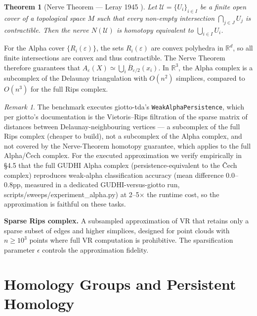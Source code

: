 \documentclass[12pt, a4paper]{report}
\newcommand{\R}{\mathbb{R}}
\theoremstyle{definition}
\theoremstyle{plain}
\newtheorem{theorem}{Theorem}[chapter]
\theoremstyle{remark}
\newtheorem{remark}{Remark}[chapter]
\begin{document}
\begin{theorem}[Nerve Theorem --- Leray 1945 \cite{leray1945}]
  \label{thm:nerve}
  Let $\mathcal{U} = \{U_i\}_{i \in I}$ be a finite open cover of a
  topological space $M$ such that every non-empty intersection
  $\bigcap_{j \in J} U_j$ is contractible. Then the nerve
  $N(\mathcal{U})$ is homotopy equivalent to $\bigcup_{i \in I} U_i$.
\end{theorem}

For the Alpha cover $\{R_i(\varepsilon)\}$, the sets $R_i(\varepsilon)$
are convex polyhedra in $\R^d$, so all finite intersections are convex
and thus contractible. The Nerve Theorem therefore guarantees that
$A_\varepsilon(X) \simeq \bigcup_i \overline{B}_{\varepsilon/2}(x_i)$.
In $\R^3$, the Alpha complex is a subcomplex of the Delaunay
triangulation with $O(n^2)$ simplices, compared to $O(n^3)$ for the
full Rips complex.

\begin{remark}
The benchmark executes giotto-tda's \texttt{WeakAlphaPersistence},
which per giotto's documentation is the Vietoris--Rips filtration of
the sparse matrix of distances between Delaunay-neighbouring vertices
--- a subcomplex of the full Rips complex (cheaper to build), not a
subcomplex of the Alpha complex, and not covered by the Nerve-Theorem
homotopy guarantee, which applies to the full Alpha/\v{C}ech complex.
For the executed approximation we verify empirically in \S4.5 that the
full GUDHI Alpha complex (persistence-equivalent to the \v{C}ech
complex) reproduces weak-alpha classification accuracy (mean
difference 0.0--0.8pp, measured in a dedicated GUDHI-versus-giotto run,
scripts/sweeps/experiment\_alpha.py) at 2--5$\times$ the runtime cost, so the
approximation is faithful on these tasks.
\end{remark}

\textbf{Sparse Rips complex.} A subsampled approximation of VR that
retains only a sparse subset of edges and higher simplices, designed
for point clouds with $n \ge 10^3$ points where full VR computation
is prohibitive. The sparsification parameter $\epsilon$ controls the
approximation fidelity.

\section{Homology Groups and Persistent Homology}
\label{sec:ph}
\end{document}

